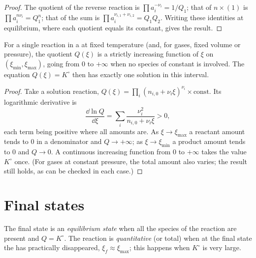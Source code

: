 \begin{proof}
The quotient of the reverse reaction is $\prod a_i^{-\nu_i} = 1/Q_1$; that
of $n \times (1)$ is $\prod a_i^{n\nu_i} = Q_1^n$; that of the sum is
$\prod a_i^{\nu_{i,1} + \nu_{i,2}} = Q_1 Q_2$. Writing these identities at
equilibrium, where each quotient equals its constant, gives the result.
\end{proof}

\begin{proposition}\label{prop:b1:extent-q-and-k:q-monotone}
For a single reaction in a  at fixed temperature (and, for
gases, fixed volume or pressure), the quotient $Q(\xi)$ is a strictly
increasing function of $\xi$ on $(\xi_{\min}, \xi_{\max})$, going from 0
to $+\infty$ when no species of constant  is involved. The
equation $Q(\xi) = K^\circ$ then has exactly one solution in this
interval.
\end{proposition}

\begin{proof}
Take a solution reaction, $Q(\xi) = \prod_i (n_{i,0} + \nu_i\xi)^{\nu_i}
\times \text{const}$. Its logarithmic derivative is
\[
  \frac{\dd \ln Q}{\dd \xi} = \sum_i \frac{\nu_i^2}{n_{i,0} + \nu_i \xi}
  > 0 ,
\]
each term being positive where all amounts are. As $\xi \to \xi_{\max}$ a
reactant amount tends to 0 in a denominator and $Q \to +\infty$; as $\xi
\to \xi_{\min}$ a product amount tends to 0 and $Q \to 0$. A continuous
increasing function from 0 to $+\infty$ takes the value $K^\circ$ once.
(For gases at constant pressure, the total amount also varies; the result
still holds, as can be checked in each case.)
\end{proof}

\section{Final states}

\begin{definition}\label{def:b1:extent-q-and-k:quantitative}
The final state is an \emph{equilibrium state}
when all the species of the reaction are present and $Q = K^\circ$. The
reaction is \emph{quantitative} (or total)
when at the final state the  has practically
disappeared, $\xi_f \approx \xi_{\max}$; this happens when $K^\circ$ is
very large.
\end{definition}

